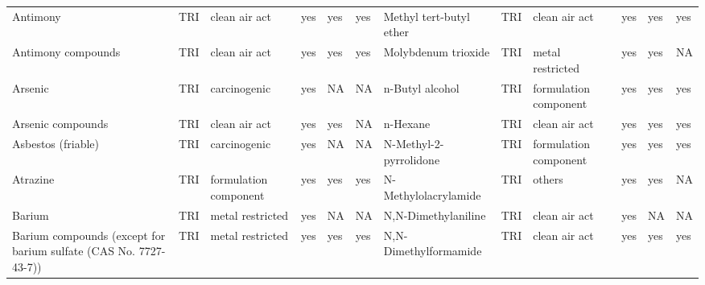 \begin{table}[H]
{\begin{tabular}{llllllllllll}
            Antimony                                                                   & TRI            & clean air act         & yes    & yes     & yes  & Methyl tert-butyl ether                                                                                            & TRI            & clean air act & yes & yes & yes\\
            Antimony compounds                                                         & TRI            & clean air act         & yes    & yes     & yes  & Molybdenum trioxide                                                                                                & TRI            & metal restricted & yes & yes & NA\\
            Arsenic                                                                    & TRI            & carcinogenic          & yes    & NA      & NA   & n-Butyl alcohol                                                                                                    & TRI            & formulation component & yes & yes & yes\\
            Arsenic compounds                                                          & TRI            & clean air act         & yes    & yes     & NA   & n-Hexane                                                                                                           & TRI            & clean air act         & yes    & yes & yes\\
            Asbestos (friable)                                                         & TRI            & carcinogenic          & yes    & NA      & NA   & N-Methyl-2-pyrrolidone                                                                                             & TRI            & formulation component & yes & yes & yes\\
            Atrazine                                                                   & TRI            & formulation component & yes    & yes     & yes  & N-Methylolacrylamide                                                                                               & TRI            & others                & yes & yes & NA\\
            Barium                                                                     & TRI            & metal restricted      & yes    & NA      & NA   & N,N-Dimethylaniline                                                                                                & TRI            & clean air act         & yes    & NA & NA\\
            Barium compounds (except for barium sulfate (CAS No. 7727-43-7))           & TRI            & metal restricted & yes & yes & yes & N,N-Dimethylformamide & TRI & clean air act & yes & yes & yes\\

\end{tabular}}
\end{table}
